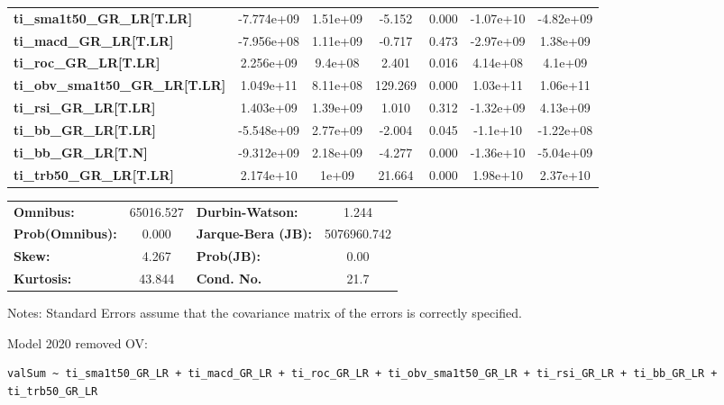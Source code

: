 \begin{center}
\begin{tabular}{lcccccc}
\textbf{ti\_sma1t50\_GR\_LR[T.LR]}      &   -7.774e+09  &     1.51e+09     &    -5.152  &         0.000        &    -1.07e+10    &    -4.82e+09     \\
\textbf{ti\_macd\_GR\_LR[T.LR]}         &   -7.956e+08  &     1.11e+09     &    -0.717  &         0.473        &    -2.97e+09    &     1.38e+09     \\
\textbf{ti\_roc\_GR\_LR[T.LR]}          &    2.256e+09  &      9.4e+08     &     2.401  &         0.016        &     4.14e+08    &      4.1e+09     \\
\textbf{ti\_obv\_sma1t50\_GR\_LR[T.LR]} &    1.049e+11  &     8.11e+08     &   129.269  &         0.000        &     1.03e+11    &     1.06e+11     \\
\textbf{ti\_rsi\_GR\_LR[T.LR]}          &    1.403e+09  &     1.39e+09     &     1.010  &         0.312        &    -1.32e+09    &     4.13e+09     \\
\textbf{ti\_bb\_GR\_LR[T.LR]}           &   -5.548e+09  &     2.77e+09     &    -2.004  &         0.045        &     -1.1e+10    &    -1.22e+08     \\
\textbf{ti\_bb\_GR\_LR[T.N]}            &   -9.312e+09  &     2.18e+09     &    -4.277  &         0.000        &    -1.36e+10    &    -5.04e+09     \\
\textbf{ti\_trb50\_GR\_LR[T.LR]}        &    2.174e+10  &        1e+09     &    21.664  &         0.000        &     1.98e+10    &     2.37e+10     \\
\bottomrule
\end{tabular}
\begin{tabular}{lclc}
\textbf{Omnibus:}       & 65016.527 & \textbf{  Durbin-Watson:     } &      1.244   \\
\textbf{Prob(Omnibus):} &    0.000  & \textbf{  Jarque-Bera (JB):  } & 5076960.742  \\
\textbf{Skew:}          &    4.267  & \textbf{  Prob(JB):          } &       0.00   \\
\textbf{Kurtosis:}      &   43.844  & \textbf{  Cond. No.          } &       21.7   \\
\bottomrule
\end{tabular}
\end{center}

Notes: \newline
 [1] Standard Errors assume that the covariance matrix of the errors is correctly specified.

Model 2020 removed OV: \begin{verbatim}valSum ~ ti_sma1t50_GR_LR + ti_macd_GR_LR + ti_roc_GR_LR + ti_obv_sma1t50_GR_LR + ti_rsi_GR_LR + ti_bb_GR_LR + ti_trb50_GR_LR\end{verbatim}

